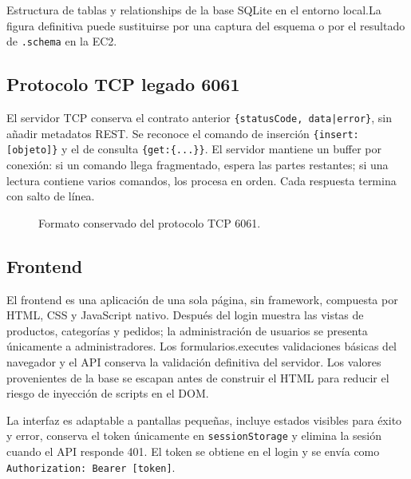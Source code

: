 \documentclass[12pt,a4paper]{article}
\begin{document}
\begin{pendingfigure}{Estructura de tablas y relationships de la base SQLite en el entorno local.}{La figura definitiva puede sustituirse por una captura del esquema o por el resultado de \texttt{.schema} en la EC2.}
\label{fig:db}
\end{pendingfigure}

\subsection{Protocolo TCP legado 6061}

El servidor TCP conserva el contrato anterior \texttt{\{statusCode, data|error\}}, sin añadir metadatos REST. Se reconoce el comando de inserción \texttt{\{insert:[objeto]\}} y el de consulta \texttt{\{get:\{...\}\}}. El servidor mantiene un buffer por conexión: si un comando llega fragmentado, espera las partes restantes; si una lectura contiene varios comandos, los procesa en orden. Cada respuesta termina con salto de línea.

\begin{figure}[H]
  \centering
  \caption{Formato conservado del protocolo TCP 6061.}
  \label{fig:tcp}
\end{figure}

\subsection{Frontend}

El frontend es una aplicación de una sola página, sin framework, compuesta por HTML, CSS y JavaScript nativo. Después del login muestra las vistas de productos, categorías y pedidos; la administración de usuarios se presenta únicamente a administradores. Los formularios.executes validaciones básicas del navegador y el API conserva la validación definitiva del servidor. Los valores provenientes de la base se escapan antes de construir el HTML para reducir el riesgo de inyección de scripts en el DOM.

La interfaz es adaptable a pantallas pequeñas, incluye estados visibles para éxito y error, conserva el token únicamente en \texttt{sessionStorage} y elimina la sesión cuando el API responde 401. El token se obtiene en el login y se envía como \texttt{Authorization: Bearer [token]}.
\end{document}
